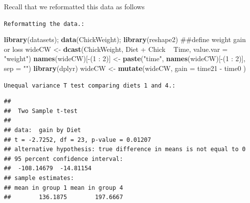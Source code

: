 \documentclass[]{article}
\newenvironment{Shaded}{\begin{snugshade}}{\end{snugshade}}
\newcommand{\KeywordTok}[1]{\textcolor[rgb]{0.13,0.29,0.53}{\textbf{{#1}}}}
\newcommand{\DataTypeTok}[1]{\textcolor[rgb]{0.13,0.29,0.53}{{#1}}}
\newcommand{\DecValTok}[1]{\textcolor[rgb]{0.00,0.00,0.81}{{#1}}}
\newcommand{\StringTok}[1]{\textcolor[rgb]{0.31,0.60,0.02}{{#1}}}
\newcommand{\OtherTok}[1]{\textcolor[rgb]{0.56,0.35,0.01}{{#1}}}
\newcommand{\NormalTok}[1]{{#1}}
\begin{document}
Recall that we reformatted this data as follows

\vspace{1pc}

\verb;Reformatting the data.:;

\begin{Shaded}
\begin{Highlighting}[]
\KeywordTok{library}\NormalTok{(datasets); }\KeywordTok{data}\NormalTok{(ChickWeight); }\KeywordTok{library}\NormalTok{(reshape2)}
\NormalTok{##define weight gain or loss}
\NormalTok{wideCW <-}\StringTok{ }\KeywordTok{dcast}\NormalTok{(ChickWeight, Diet +}\StringTok{ }\NormalTok{Chick ~}\StringTok{ }\NormalTok{Time,}
                \DataTypeTok{value.var =} \StringTok{"weight"}\NormalTok{)}
\KeywordTok{names}\NormalTok{(wideCW)[-(}\DecValTok{1} \NormalTok{:}\StringTok{ }\DecValTok{2}\NormalTok{)] <-}\StringTok{ }\KeywordTok{paste}\NormalTok{(}\StringTok{"time"}\NormalTok{,}
                                 \KeywordTok{names}\NormalTok{(wideCW)[-(}\DecValTok{1} \NormalTok{:}\StringTok{ }\DecValTok{2}\NormalTok{)],}
                                 \DataTypeTok{sep =} \StringTok{""}\NormalTok{)}
\KeywordTok{library}\NormalTok{(dplyr)}
\NormalTok{wideCW <-}\StringTok{ }\KeywordTok{mutate}\NormalTok{(wideCW,}
  \DataTypeTok{gain =} \NormalTok{time21 -}\StringTok{ }\NormalTok{time0}
\NormalTok{)}
\end{Highlighting}
\end{Shaded}

\vspace{1pc}

\verb;Unequal variance T test comparing diets 1 and 4.:;

\begin{Shaded}
\end{Shaded}

\begin{verbatim}
## 
##  Two Sample t-test
## 
## data:  gain by Diet
## t = -2.7252, df = 23, p-value = 0.01207
## alternative hypothesis: true difference in means is not equal to 0
## 95 percent confidence interval:
##  -108.14679  -14.81154
## sample estimates:
## mean in group 1 mean in group 4 
##        136.1875        197.6667
\end{verbatim}
\end{document}
